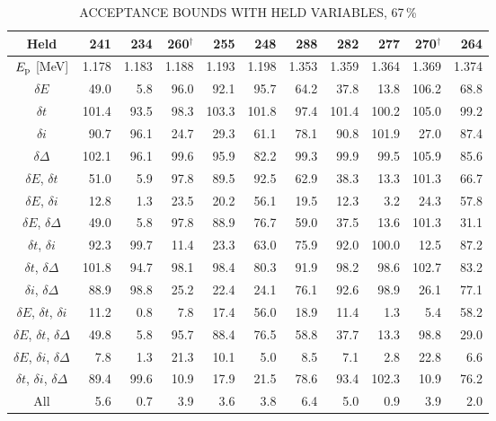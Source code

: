 \begin{table}
\small
    \begin{center}
        \label{tab:acceptance-uncertainty-67}
        \caption{ACCEPTANCE BOUNDS WITH HELD VARIABLES, 67\,\%}
        \begin{tabular}{crrrrrrrrrr}
            \toprule
            \midrule
            \textbf{Held}
                & \textbf{241} & \textbf{234} & \textbf{260}$^\dagger$ & \textbf{255} & \textbf{248}
                & \textbf{288} & \textbf{282} & \textbf{277} & \textbf{270}$^\dagger$ & \textbf{264} \\
            \midrule
$E_{\rm p}$ [MeV] & 1.178 & 1.183 & 1.188 & 1.193 & 1.198 & 1.353 & 1.359 & 1.364 & 1.369 & 1.374 \\
\midrule
$\delta E$     &  49.0 &   5.8 &  96.0 &  92.1 &  95.7 &  64.2 &  37.8 &  13.8 & 106.2 &  68.8 \\
$\delta t$     & 101.4 &  93.5 &  98.3 & 103.3 & 101.8 &  97.4 & 101.4 & 100.2 & 105.0 &  99.2 \\
$\delta i$     &  90.7 &  96.1 &  24.7 &  29.3 &  61.1 &  78.1 &  90.8 & 101.9 &  27.0 &  87.4 \\
$\delta\Delta$ & 102.1 &  96.1 &  99.6 &  95.9 &  82.2 &  99.3 &  99.9 &  99.5 & 105.9 &  85.6 \\
$\delta E$, $\delta t$     &  51.0 &   5.9 &  97.8 &  89.5 &  92.5 &  62.9 &  38.3 &  13.3 & 101.3 &  66.7 \\
$\delta E$, $\delta i$     &  12.8 &   1.3 &  23.5 &  20.2 &  56.1 &  19.5 &  12.3 &   3.2 &  24.3 &  57.8 \\
$\delta E$, $\delta\Delta$ &  49.0 &   5.8 &  97.8 &  88.9 &  76.7 &  59.0 &  37.5 &  13.6 & 101.3 &  31.1 \\
$\delta t$, $\delta i$     &  92.3 &  99.7 &  11.4 &  23.3 &  63.0 &  75.9 &  92.0 & 100.0 &  12.5 &  87.2 \\
$\delta t$, $\delta\Delta$ & 101.8 &  94.7 &  98.1 &  98.4 &  80.3 &  91.9 &  98.2 &  98.6 & 102.7 &  83.2 \\
$\delta i$, $\delta\Delta$ &  88.9 &  98.8 &  25.2 &  22.4 &  24.1 &  76.1 &  92.6 &  98.9 &  26.1 &  77.1 \\
$\delta E$, $\delta t$, $\delta i$     &  11.2 &   0.8 &   7.8 &  17.4 &  56.0 &  18.9 &  11.4 &   1.3 &   5.4 &  58.2 \\
$\delta E$, $\delta t$, $\delta\Delta$ &  49.8 &   5.8 &  95.7 &  88.4 &  76.5 &  58.8 &  37.7 &  13.3 &  98.8 &  29.0 \\
$\delta E$, $\delta i$, $\delta\Delta$ &   7.8 &   1.3 &  21.3 &  10.1 &   5.0 &   8.5 &   7.1 &   2.8 &  22.8 &   6.6 \\
$\delta t$, $\delta i$, $\delta\Delta$ &  89.4 &  99.6 &  10.9 &  17.9 &  21.5 &  78.6 &  93.4 & 102.3 &  10.9 &  76.2 \\
All &   5.6 &   0.7 &   3.9 &   3.6 &   3.8 &   6.4 &   5.0 &   0.9 &   3.9 &   2.0 \\
            \bottomrule
        \end{tabular}


\end{center}
\end{table}
